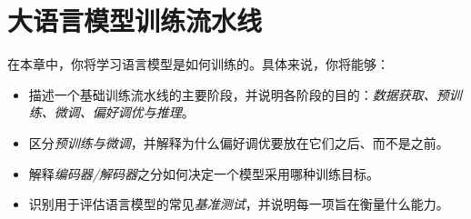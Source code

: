 
\chapter[LLM 训练流水线]{大语言模型训练流水线}\label{chap:pipeline}


\begin{learningbox}
在本章中，你将学习语言模型是如何训练的。具体来说，你将能够：
\begin{itemize}[leftmargin=*, nosep]
    \item 描述一个基础训练流水线的主要阶段，并说明各阶段的目的：{\em 数据获取、预训练、微调、偏好调优与推理}。
    \item 区分{\em 预训练与微调}，并解释为什么偏好调优要放在它们之后、而不是之前。
    \item 解释{\em 编码器/解码器}之分如何决定一个模型采用哪种训练目标。
    \item 识别用于评估语言模型的常见{\em 基准测试}，并说明每一项旨在衡量什么能力。
\end{itemize}
\end{learningbox}

